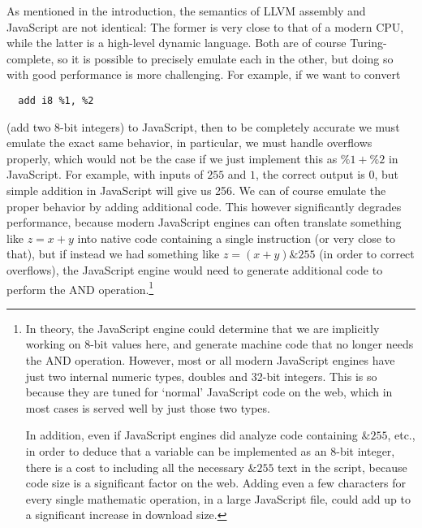 \documentclass[preprint,10pt]{sigplanconf}
\begin{document}
As mentioned in the introduction, the semantics of LLVM assembly and JavaScript are not identical: The former
is very close to that of a modern CPU, while the latter is a high-level
dynamic language. Both are of course Turing-complete, so it is possible to
precisely emulate each in the other, but doing so with good performance is
more challenging. For example, if we want to convert
\begin{verbatim}
  add i8 %1, %2
\end{verbatim}
(add two 8-bit integers) to JavaScript, then to be completely accurate we must emulate the
exact same behavior, in particular, we must handle overflows properly, which would not be the case if we just implement
this as $\%1 + \%2$ in JavaScript. For example, with inputs of $255$ and $1$, the
correct output is 0, but simple addition in JavaScript will give us 256. We
can of course emulate the proper behavior by adding additional code.
This however significantly degrades performance,
because modern JavaScript engines can often translate something like $z = x + y$ into
native code containing a single instruction (or very close to that), but if instead we had
something like $z = (x + y)\&255$ (in order to correct overflows), the JavaScript engine
would need to generate additional code to perform the AND operation.\footnote{
In theory, the JavaScript engine could determine that we are implicitly working
on 8-bit values here, and generate machine code that no longer needs the AND operation.
However, most or all modern JavaScript engines have just two internal numeric types, doubles and
32-bit integers. This is so because they are tuned for `normal' JavaScript code
on the web, which in most cases is served well by just those two types.

In addition, even if JavaScript engines did analyze code containing $\&255$, etc.,
in order to deduce that a variable can be implemented
as an 8-bit integer, there is a cost to including all the necessary $\&255$ text
in the script, because code size is a significant factor on the web. Adding even
a few characters for every single mathematic operation, in a large JavaScript file,
could add up to a significant increase in download size.}
\end{document}
